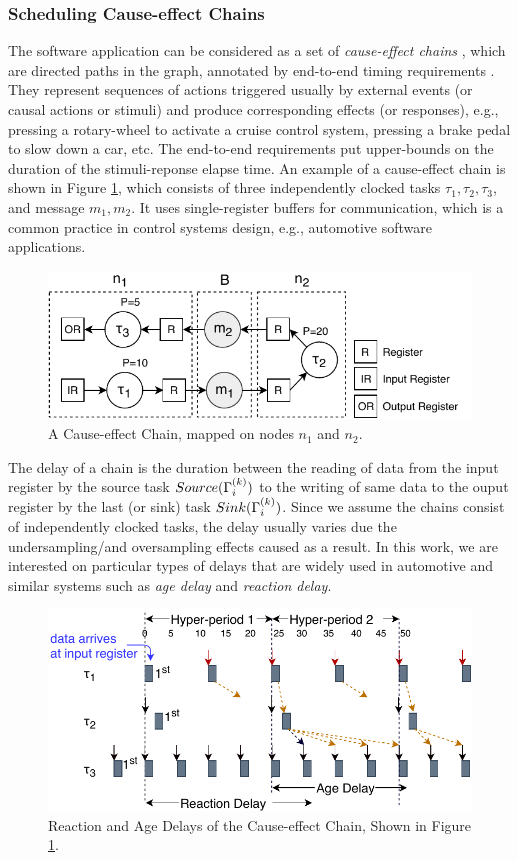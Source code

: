 \subsubsection{Scheduling Cause-effect Chains}\label{subsec_causeeffectchains}
The software application can be considered as a set of \textit{cause-effect chains} \sexpsp{\Gamma}{\Gamma}, which are  directed paths in the graph, annotated by end-to-end timing requirements . They represent sequences of actions triggered usually by external events (or causal actions or stimuli) and produce corresponding effects (or responses), e.g.,  pressing a rotary-wheel to activate a cruise control system, pressing a brake pedal to slow down a car, etc. The end-to-end requirements put upper-bounds on the duration of the stimuli-reponse elapse time. An example of a cause-effect chain is shown in Figure \ref{fig_causeeffectchainntk}, which consists of three independently clocked tasks $\tau_1,\tau_2,\tau_3$, and message $m_1,m_2$. It uses single-register buffers for communication, which is a common practice in control systems design, e.g., automotive software applications.
\begin{figure}
	\centering
	\includegraphics[width=0.7\linewidth]{img/cause_effect_chain_ntk}
	\caption{A Cause-effect Chain, mapped on nodes $n_1$ and $n_2$.}
	\label{fig_causeeffectchainntk}
\end{figure}

The delay of a chain is the duration between the reading of data from the input register by the source task $Source(\sss{\Gamma})$ to the writing of same data to the ouput register by the last (or sink) task $Sink(\sss{\Gamma})$. Since we assume the chains consist of independently clocked tasks, the delay usually varies due the undersampling/and oversampling effects caused as a result. In this work, we are interested on particular types of delays that are widely used in automotive and similar systems such as \textit{age delay} and\textit{ reaction delay}. 
\begin{figure}
	\centering
	\includegraphics[width=0.9\linewidth]{img/timedchain_ntk}
	\caption{Reaction and Age Delays of the Cause-effect Chain, Shown in Figure {\ref{fig_causeeffectchainntk}}.}
	\label{fig_timedchainntk}
\end{figure}

